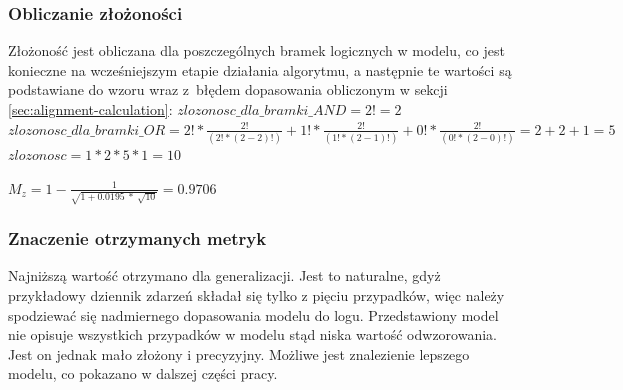 \subsubsection{Obliczanie złożoności}
Złożoność jest obliczana dla poszczególnych bramek logicznych w modelu, co jest konieczne na wcześniejszym etapie działania algorytmu, a następnie te wartości są podstawiane do wzoru wraz z~błędem dopasowania obliczonym w sekcji \ref{sec:alignment-calculation}:\newline
$zlozonosc\_dla\_bramki\_AND = 2! = 2$\newline
$zlozonosc\_dla\_bramki\_OR = 2! * \frac{2!}{(2! * (2 - 2)!)} + 1! *  \frac{2!}{(1! * (2 - 1)!)} + 0! * \frac{2!}{(0! * (2 - 0)!)} = 2 + 2 + 1 = 5$\newline
$zlozonosc = 1 * 2 * 5 * 1 = 10$
\begin{center}
$M_z = 1 - \frac{1}{\sqrt{1 + 0.0195\ *\ \sqrt{10}}} = 0.9706$
\end{center}

\subsubsection{Znaczenie otrzymanych metryk}
Najniższą wartość otrzymano dla generalizacji. Jest to naturalne, gdyż przykładowy dziennik zdarzeń składał się tylko z pięciu przypadków, więc należy spodziewać się nadmiernego dopasowania modelu do logu. Przedstawiony model nie opisuje wszystkich przypadków w modelu stąd niska wartość odwzorowania. Jest on jednak mało złożony i precyzyjny. Możliwe jest znalezienie lepszego modelu, co pokazano w dalszej części pracy.